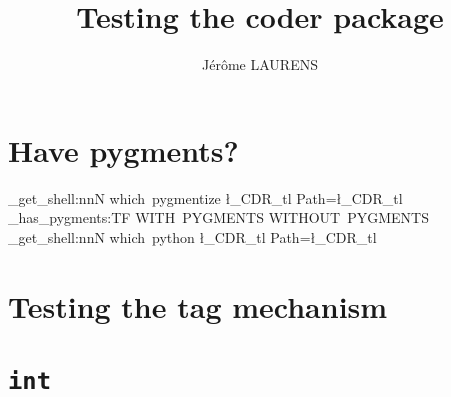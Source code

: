 \documentclass[10pt,a4paper]{article}
\begin{document}
\title{Testing the \textsf{coder} package}
\author{Jérôme LAURENS}
\maketitle

\section{Have \textsf{pygments}?}
\ExplSyntaxOn
\sys_get_shell:nnN {which~pygmentize} {} \l_CDR_tl
Path=\l_CDR_tl\\
\CDR_has_pygments:TF { WITH~PYGMENTS } { WITHOUT~PYGMENTS }\\
\sys_get_shell:nnN {which~python} {} \l_CDR_tl
Path=\l_CDR_tl\\
\ExplSyntaxOff

%
%

\section{Testing the tag mechanism}
\makeatletter\ExplSyntaxOn
\def\CDR@Debug { \use_none:n }
\ExplSyntaxOff\makeatother


\section{}
\makeatletter\ExplSyntaxOn
\def\CDR@Debug { \use_none:n }
\ExplSyntaxOff\makeatother


\section{}
\makeatletter\ExplSyntaxOn
\def\CDR@Debug { \use_none:n }
\ExplSyntaxOff\makeatother


\section{\texttt{int}}
\makeatletter\ExplSyntaxOn
\def\CDR@Debug { \use_none:n }
\ExplSyntaxOff\makeatother

\end{document}
